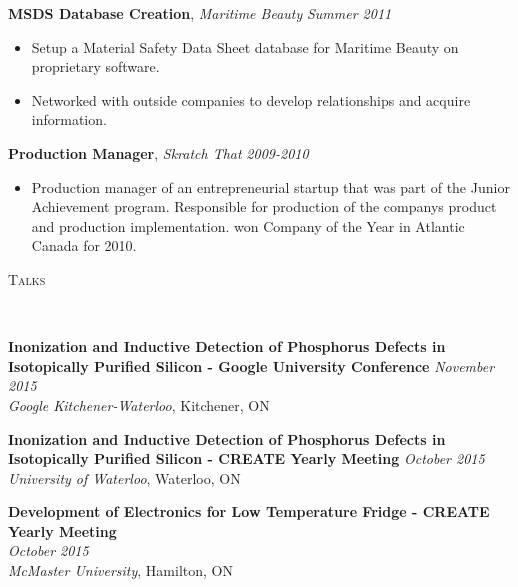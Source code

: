\documentclass[9pt]{article}
\newenvironment{changemargin}[2]{%
  \begin{list}{}{%
    \setlength{\topsep}{0pt}%
    \setlength{\leftmargin}{#1}%
    \setlength{\rightmargin}{#2}%
    \setlength{\listparindent}{\parindent}%
    \setlength{\itemindent}{\parindent}%
    \setlength{\parsep}{\parskip}%
  }%
  \item[]}{\end{list}
}
\newcommand{\lineover}{
	\begin{changemargin}{-0.05in}{-0.05in}
		\vspace*{-8pt}
		\hrulefill \\
		\vspace*{-2pt}
	\end{changemargin}
}
\newcommand{\header}[1]{
	\begin{changemargin}{-0.5in}{-0.5in}
		\scshape{#1}\\
  	\lineover
	\end{changemargin}
}
\newenvironment{body} {
	\vspace*{-16pt}
	\begin{changemargin}{-0.25in}{-0.5in}
  }	
	{\end{changemargin}
}
\begin{document}
\begin{body}
	\textbf {MSDS Database Creation}, \emph{Maritime Beauty} \hfill \emph{Summer 2011}\\
	\vspace*{-4pt}
	\begin{itemize} \itemsep -0pt
		\item Setup a Material Safety Data Sheet database for Maritime Beauty on proprietary software. 
		\item Networked with outside companies to develop relationships and acquire information. 
	\end{itemize}
	\textbf {Production Manager}, \emph{Skratch That} \hfill \emph{2009-2010}\\
	\vspace*{-4pt}
	\begin{itemize} \itemsep -0pt
		\item Production manager of an entrepreneurial startup that was part of the Junior Achievement program.
		Responsible for production of the companys product and production implementation.  won
		Company of the Year in Atlantic Canada for 2010.
	\end{itemize}
\end{body}

\smallskip

\header{Talks}
\begin{body}
	\vspace{14pt}
	\textbf{ Inonization and Inductive Detection of Phosphorus Defects in Isotopically Purified Silicon - Google University Conference }{} \hfill \emph{November 2015}{} \\
	\emph{Google Kitchener-Waterloo}, Kitchener, ON{} \\
\end{body}  
\begin{body}
	\vspace{14pt}
	\textbf{ Inonization and Inductive Detection of Phosphorus Defects in Isotopically Purified Silicon - CREATE Yearly Meeting}{} \hfill \emph{October 2015}{} \\
	\emph{University of Waterloo}, Waterloo, ON{} \\
\end{body}
\begin{body}
	\vspace{14pt}
	\textbf{ Development of Electronics for Low Temperature Fridge - CREATE Yearly Meeting}{} \\ \hfill \emph{October 2015}{} \\
	\emph{McMaster University}, Hamilton, ON{} \\
\end{body}
\end{document}
